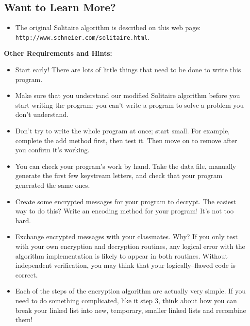 \documentclass[]{article}
\begin{document}
\subsection{Want to Learn More?}

\begin{itemize}
\item The original Solitaire algorithm is described on this web page: \\
\verb+http://www.schneier.com/solitaire.html+.
\end{itemize}

\newpage

\textbf{Other Requirements and Hints:}

\begin{itemize}
\item Start early!  There are lots of little things that need to be done to
write this program. 
\vspace*{-0.25cm}
\item Make sure that you understand our modified Solitaire algorithm before
you start
writing the program; you can't write a program to solve a problem 
you don't understand.
\vspace*{-0.25cm}
\item Don't try to write the whole program at once; start small.  For example,
complete the add method first, then test it.  Then move on to remove after you confirm it's working.
\vspace*{-0.25cm}
\item You can check your program's work by hand.  Take the data file,
manually generate the first few keystream letters, and check that your
program generated the same ones.
\vspace*{-0.25cm}
\item Create some encrypted messages for your program to decrypt.  The
easiest way to do this?  Write an encoding method for your program!  
It's not too hard.  
\vspace*{-0.25cm}
\item Exchange encrypted messages with your classmates.  Why?  If you only
test with your own encryption and decryption routines, any logical
error with the algorithm implementation is likely to appear in both
routines.  Without independent verification, you may think that
your logically--flawed code is correct.
\vspace*{-0.25cm}
\item Each of the steps of the encryption algorithm are actually very simple.  If you need to do something complicated, like it step 3, think about how you can break your linked list into  new, temporary, smaller linked lists and recombine them!
\end{itemize}
\end{document}

